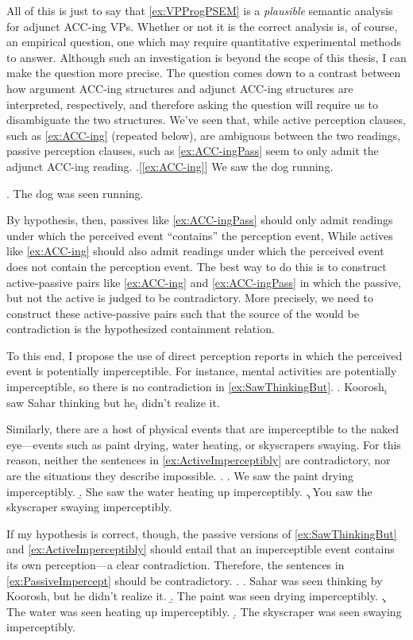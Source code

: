 \documentclass[MilwayThesis]{subfiles}
\begin{document}
All of this is just to say that \cref{ex:VPProgPSEM} is a \textit{plausible} semantic analysis for adjunct ACC-ing VPs.
Whether or not it is the correct analysis is, of course, an empirical question, one which may require quantitative experimental methods to answer.
Although such an investigation is beyond the scope of this thesis, I can make the question more precise.
The question comes down to a contrast between how argument ACC-ing structures and adjunct ACC-ing structures are interpreted, respectively, and therefore asking the question will require us to disambiguate the two structures.
We've seen that, while active perception clauses, such as \cref{ex:ACC-ing} (repeated below), are ambiguous between the two readings, passive perception clauses, such as \cref{ex:ACC-ingPass} seem to only admit the adjunct ACC-ing reading.
\ex.[\cref{ex:ACC-ing}] We saw the dog running.

\ex.\label{ex:ACC-ingPass} The dog was seen running.

By hypothesis, then, passives like \cref{ex:ACC-ingPass} should only admit readings under which the perceived event ``contains'' the perception event, While actives like \cref{ex:ACC-ing} should also admit readings under which the perceived event does not contain the perception event.
The best way to do this is to construct active-passive pairs like \cref{ex:ACC-ing} and \cref{ex:ACC-ingPass} in which the passive, but not the active is judged to be contradictory.
More precisely, we need to construct these active-passive pairs such that the source of the would be contradiction is the hypothesized containment relation.

To this end, I propose the use of direct perception reports in which the perceived event is potentially imperceptible.
For instance, mental activities are potentially imperceptible, so there is no contradiction in \cref{ex:SawThinkingBut}.
\ex.\label{ex:SawThinkingBut} Koorosh$_{i}$ saw Sahar thinking but he$_{i}$ didn't realize it.

Similarly, there are a host of physical events that are imperceptible to the naked eye---events such as paint drying, water heating, or skyscrapers swaying.
For this reason, neither the sentences in \cref{ex:ActiveImperceptibly} are contradictory, nor are the situations they describe impossible.
\ex.\label{ex:ActiveImperceptibly}
\a. We saw the paint drying imperceptibly.
\b. She saw the water heating up imperceptibly.
\c. You saw the skyscraper swaying imperceptibly.

If my hypothesis is correct, though, the passive versions of \cref{ex:SawThinkingBut} and \cref{ex:ActiveImperceptibly} should entail that an imperceptible event contains its own perception---a clear contradiction.
Therefore, the sentences in \cref{ex:PassiveImpercept} should be contradictory.
\ex.\label{ex:PassiveImpercept} 
\a. Sahar was seen thinking by Koorosh, but he didn't realize it.
\b. The paint was seen drying imperceptibly.
\c. The water was seen heating up imperceptibly.
\d. The skyscraper was seen swaying imperceptibly.
\end{document}
